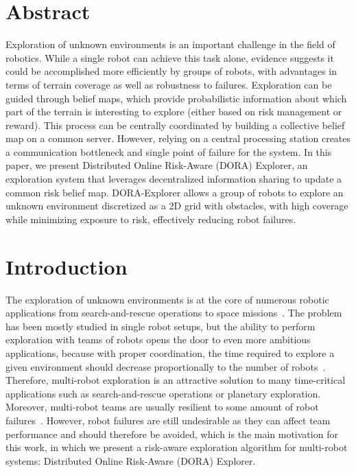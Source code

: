 \label{sec:Theme1}
 

\section{Abstract}
    Exploration of unknown environments is an important challenge in the
    field of robotics. While a single robot can achieve this task alone,
    evidence suggests it could be accomplished more efficiently by
    groups of robots, with advantages in terms of terrain coverage as
    well as robustness to failures. Exploration can be guided through
    belief maps, which provide probabilistic information about which
    part of the terrain is interesting to explore (either based on risk
    management or reward). This process can be centrally coordinated by
    building a collective belief map on a common server. However,
    relying on a central processing station creates a communication
    bottleneck and single point of failure for the system. In this
    paper, we present Distributed Online Risk-Aware (DORA) Explorer, an
    exploration system that leverages decentralized information sharing
    to update a common risk belief map. DORA-Explorer allows a group of
    robots to explore an unknown environment discretized as a 2D grid
    with obstacles, with high coverage while minimizing exposure to
    risk, effectively reducing robot failures.


\section{Introduction}
The exploration of unknown environments is at the core of numerous
robotic applications from search-and-rescue operations
\cite{matos2016multiple} to space
missions~\cite{fong2005interaction}. The problem has been mostly
studied in single robot setups, but the ability to perform exploration
with teams of robots opens the door to even more ambitious
applications, because with proper coordination, the time required to
explore a given environment should decrease proportionally to the
number of robots~\cite{burgard2005coordinated}. Therefore, multi-robot
exploration is an attractive solution to many time-critical
applications such as search-and-rescue operations or planetary
exploration. Moreover, multi-robot teams are usually resilient to some
amount of robot
failures~\cite{ramachandran2019resilience,wehbe2021probabilistic,winfield2006safety}. However,
robot failures are still undesirable as they can affect team
performance and should therefore be avoided, which is the main
motivation for this work, in which we present a risk-aware exploration
algorithm for multi-robot systems: Distributed Online Risk-Aware
(DORA) Explorer.

